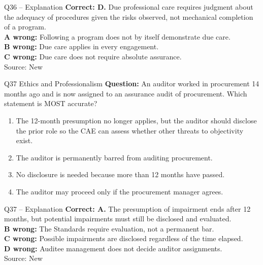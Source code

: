 \documentclass[aspectratio=169,10pt]{beamer}
\begin{document}
\begin{frame}[t]{Q36 -- Explanation}
	\footnotesize
	\textbf{Correct: D.} Due professional care requires judgment about the adequacy of procedures given the risks observed, not mechanical completion of a program. \\[5pt]
\textbf{A wrong:} Following a program does not by itself demonstrate due care. \\[3pt]
\textbf{B wrong:} Due care applies in every engagement. \\[3pt]
\textbf{C wrong:} Due care does not require absolute assurance. \\[3pt]
	\vfill {\tiny Source: New}
\end{frame}

\begin{frame}[t]{Q37 \hfill {\scriptsize Ethics and Professionalism}}
	\small
	\textbf{Question:} An auditor worked in procurement 14 months ago and is now assigned to an assurance audit of procurement. Which statement is MOST accurate?
	\begin{enumerate}[label=\Alph*.,itemsep=1pt,topsep=3pt]
			\item The 12-month presumption no longer applies, but the auditor should disclose the prior role so the CAE can assess whether other threats to objectivity exist.
			\item The auditor is permanently barred from auditing procurement.
			\item No disclosure is needed because more than 12 months have passed.
			\item The auditor may proceed only if the procurement manager agrees.
	\end{enumerate}
\end{frame}

\begin{frame}[t]{Q37 -- Explanation}
	\footnotesize
	\textbf{Correct: A.} The presumption of impairment ends after 12 months, but potential impairments must still be disclosed and evaluated. \\[5pt]
\textbf{B wrong:} The Standards require evaluation, not a permanent bar. \\[3pt]
\textbf{C wrong:} Possible impairments are disclosed regardless of the time elapsed. \\[3pt]
\textbf{D wrong:} Auditee management does not decide auditor assignments. \\[3pt]
	\vfill {\tiny Source: New}
\end{frame}
\end{document}
